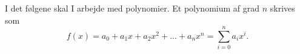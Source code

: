 I det følgene skal I arbejde med polynomier. Et polynomium af grad $n$ skrives som
$$f(x) = a_0+a_1x+a_2x^2+...+a_nx^n = \sum_{i=0}^na_ix^i.$$
